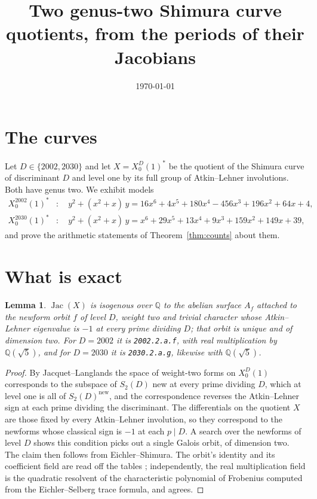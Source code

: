 \documentclass[11pt,reqno]{amsart}
\theoremstyle{plain}
\newtheorem{lemma}[theorem]{Lemma}
\theoremstyle{definition}
\DeclareMathOperator{\Jac}{Jac}
\newcommand{\Q}{\mathbb{Q}}
\begin{document}
\title{Two genus-two Shimura curve quotients, from the periods of their Jacobians}
\author{}
\date{\today}
\maketitle

\section{The curves}

Let $D \in \{2002, 2030\}$ and let $X = X_0^D(1)^*$ be the quotient of the Shimura curve of
discriminant $D$ and level one by its full group of Atkin--Lehner involutions. Both have genus two.
We exhibit models
\begin{align*}
  X_0^{2002}(1)^* &: \quad y^2 + (x^2+x)\,y = 16x^6 + 4x^5 + 180x^4 - 456x^3 + 196x^2 + 64x + 4,\\
  X_0^{2030}(1)^* &: \quad y^2 + (x^2+x)\,y = x^6 + 29x^5 + 13x^4 + 9x^3 + 159x^2 + 149x + 39,
\end{align*}
and prove the arithmetic statements of Theorem~\ref{thm:counts} about them.

\section{What is exact}\label{sec:exact}

\begin{lemma}\label{lem:jac}
$\Jac(X)$ is isogenous over $\Q$ to the abelian surface $A_f$ attached to the newform orbit $f$ of
level $D$, weight two and trivial character whose Atkin--Lehner eigenvalue is $-1$ at every prime
dividing $D$; that orbit is unique and of dimension two. For $D = 2002$ it is \texttt{2002.2.a.f},
with real multiplication by $\Q(\sqrt 5)$, and for $D = 2030$ it is \texttt{2030.2.a.g}, likewise
with $\Q(\sqrt 5)$.
\end{lemma}

\begin{proof}
By Jacquet--Langlands the space of weight-two forms on $X_0^D(1)$ corresponds to the subspace of
$S_2(D)$ new at every prime dividing $D$, which at level one is all of $S_2(D)^{\mathrm{new}}$, and
the correspondence reverses the Atkin--Lehner sign at each prime dividing the discriminant. The
differentials on the quotient $X$ are those fixed by every Atkin--Lehner involution, so they
correspond to the newforms whose classical sign is $-1$ at each $p \mid D$. A search over the
newforms of level $D$ shows this condition picks out a single Galois orbit, of dimension two. The
claim then follows from Eichler--Shimura. The orbit's identity and its coefficient field are read
off the tables \cite{lmfdb}; independently, the real multiplication field is the quadratic
resolvent of the characteristic polynomial of Frobenius computed from the Eichler--Selberg trace
formula, and agrees.
\end{proof}
\end{document}
